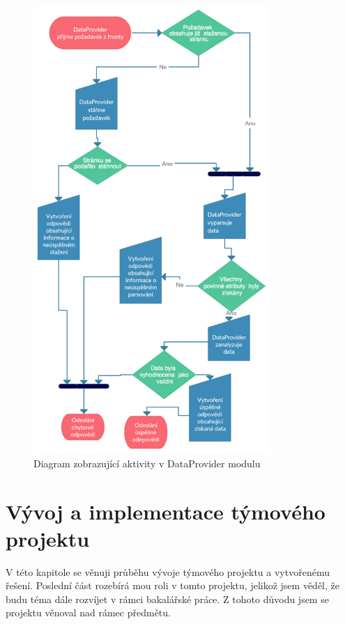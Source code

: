 \documentclass[thesis=B,czech]{FITthesis}[2012/06/26]
\begin{document}
\begin{figure}\centering
 	\includegraphics[width=0.8\textwidth]{resources/DataProvider-activity}
	\caption[DataProvider diagram]{Diagram zobrazující aktivity v DataProvider modulu}\label{fig:dp}
\end{figure}

\chapter{Vývoj a implementace týmového projektu}
V této kapitole se věnuji průběhu vývoje týmového projektu a vytvořenému řešení. Poslední část rozebírá mou roli v tomto
projektu, jelikož jsem věděl, že budu téma dále rozvíjet v rámci bakalářské práce. 
Z tohoto důvodu jsem se projektu věnoval nad rámec předmětu. 
\end{document}
